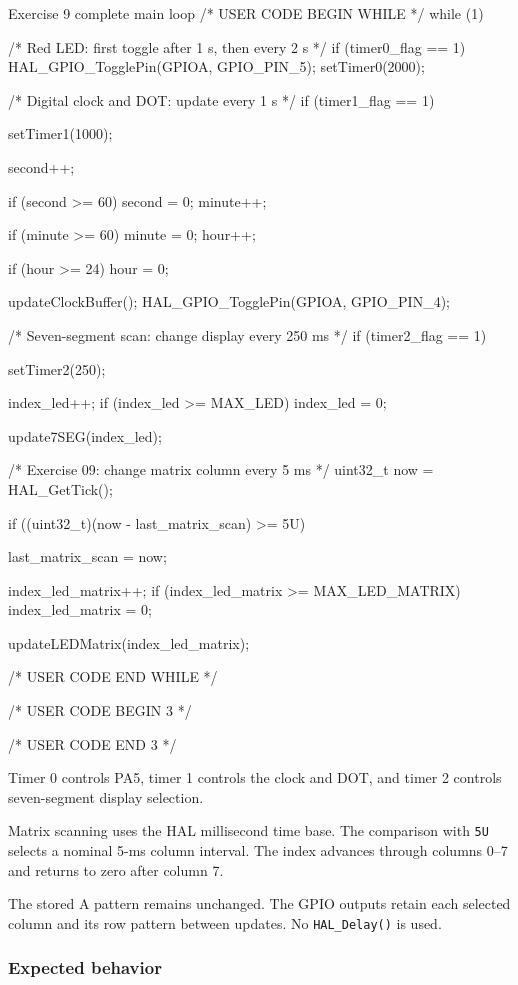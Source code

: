 \documentclass[a4paper]{article}
\begin{document}
\begin{stmcode}{Exercise 9 complete main loop}
/* USER CODE BEGIN WHILE */
while (1) {
    /* Red LED: first toggle after 1 s, then every 2 s */
    if (timer0_flag == 1) {
      HAL_GPIO_TogglePin(GPIOA, GPIO_PIN_5);
      setTimer0(2000);
    }

    /* Digital clock and DOT: update every 1 s */
    if (timer1_flag == 1) {
      setTimer1(1000);

      second++;

      if (second >= 60) {
        second = 0;
        minute++;
      }

      if (minute >= 60) {
        minute = 0;
        hour++;
      }

      if (hour >= 24) {
        hour = 0;
      }

      updateClockBuffer();
      HAL_GPIO_TogglePin(GPIOA, GPIO_PIN_4);
    }

    /* Seven-segment scan: change display every 250 ms */
    if (timer2_flag == 1) {
      setTimer2(250);

      index_led++;
      if (index_led >= MAX_LED) {
        index_led = 0;
      }

      update7SEG(index_led);
    }

    /* Exercise 09: change matrix column every 5 ms */
    uint32_t now = HAL_GetTick();

    if ((uint32_t)(now - last_matrix_scan) >= 5U) {
      last_matrix_scan = now;

      index_led_matrix++;
      if (index_led_matrix >= MAX_LED_MATRIX) {
        index_led_matrix = 0;
      }

      updateLEDMatrix(index_led_matrix);
    }
    /* USER CODE END WHILE */

    /* USER CODE BEGIN 3 */
}
/* USER CODE END 3 */
\end{stmcode}

Timer 0 controls PA5, timer 1 controls the
clock and DOT, and timer 2 controls
seven-segment display selection.

Matrix scanning uses the HAL millisecond
time base. The comparison with \texttt{5U}
selects a nominal 5-ms column interval.
The index advances through columns 0--7
and returns to zero after column 7.

The stored A pattern remains unchanged.
The GPIO outputs retain each selected
column and its row pattern between updates.
No \texttt{HAL\_Delay()} is used.

\subsubsection{Expected behavior}
\end{document}
